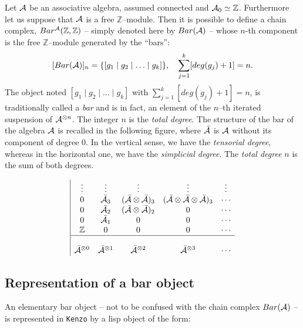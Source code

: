 Let $\cal A$ be an associative algebra, assumed connected and  ${\cal A}_0 \simeq \mathbb{Z}$.
Furthermore let us suppose that ${\cal A}$ is a free $\mathbb{Z}$--module. Then it is possible
to define a chain complex, $Bar^{\cal A}({\mathbb{Z}}, {\mathbb{Z}})$ -- simply denoted here by $Bar({\cal A})$ --
whose $n$-th component is the free $\mathbb{Z}$--module generated by the ``bars'':
$$ [Bar({\cal A})]_n = \{ [g_1 \mid g_2 \mid \ldots \mid g_k] \}, \quad \sum_{j=1}^{k} [deg(g_j)+1] =n. $$
The object noted $[g_1 \mid g_2 \mid \ldots \mid g_k]$
with $\sum_{j=1}^{k} [deg(g_j)+1] =n$, is tra\-di\-ti\-o\-nal\-ly
called a {\em bar} and is in fact,  an element of the $n$--th iterated suspension of
${\cal A}^{\otimes n}$. The integer $n$ is the {\em total degree}. The structure of
the bar of the algebra ${\cal A}$ is recalled in the following figure, where $\bar{\cal A}$
is ${\cal A}$ without its component of degree $0$. In the vertical sense, we have the {\em tensorial degree},
whereas in the horizontal one, we have the {\em simplicial degree}. The {\em total degree} $n$ is the
sum of both degrees.

$$\begin{array}{|ccccc}
              \vdots & \vdots & \vdots &\vdots & \vdots \\
              0 & \bar{\cal A}_3 & (\bar{\cal A} \otimes \bar{\cal A})_3 &
             (\bar{\cal A}\otimes \bar{\cal A}\otimes\bar{\cal A})_3 & \cdots \\
              0 & \bar{\cal A}_2 & (\bar{\cal A}\otimes\bar{\cal A})_2 & 0 & \cdots \\
              0 & \bar{\cal A}_1 & 0 & 0 & \cdots \\
              \mathbb{Z} & 0 & 0 & 0 & \cdots \\ \hline
                   &   &   &   &    \\
             \bar{\cal A}^{\otimes 0} & \bar{\cal A}^{\otimes 1} & \bar{\cal A}^{\otimes 2} &
             \bar{\cal A}^{\otimes 3} & \cdots
\end{array} $$

\subsection {Representation of a bar object}

An elementary bar object
-- not to be confused with the chain complex $Bar({\cal A})$ --
is represented in {\tt Kenzo} by a lisp object of the form:

